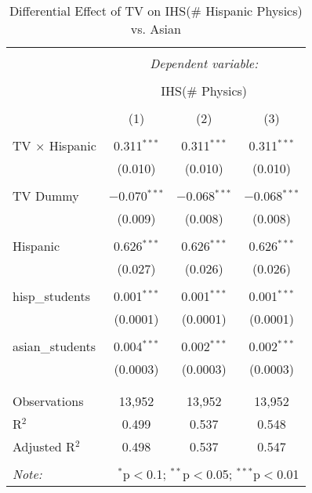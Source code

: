 
\begin{table}[!htbp] \centering 
  \caption{Differential Effect of TV on IHS(\# Hispanic Physics) vs. Asian} 
  \label{} 
\begin{tabular}{@{\extracolsep{-2pt}}lccc} 
\\[-1.8ex]\hline 
\hline \\[-1.8ex] 
 & \multicolumn{3}{c}{\textit{Dependent variable:}} \\ 
\cline{2-4} 
\\[-1.8ex] & \multicolumn{3}{c}{IHS(\# Physics)} \\ 
\\[-1.8ex] & (1) & (2) & (3)\\ 
\hline \\[-1.8ex] 
 TV $\times$ Hispanic & 0.311$^{***}$ & 0.311$^{***}$ & 0.311$^{***}$ \\ 
  & (0.010) & (0.010) & (0.010) \\ 
  & & & \\ 
 TV Dummy & $-$0.070$^{***}$ & $-$0.068$^{***}$ & $-$0.068$^{***}$ \\ 
  & (0.009) & (0.008) & (0.008) \\ 
  & & & \\ 
 Hispanic & 0.626$^{***}$ & 0.626$^{***}$ & 0.626$^{***}$ \\ 
  & (0.027) & (0.026) & (0.026) \\ 
  & & & \\ 
 hisp\_students & 0.001$^{***}$ & 0.001$^{***}$ & 0.001$^{***}$ \\ 
  & (0.0001) & (0.0001) & (0.0001) \\ 
  & & & \\ 
 asian\_students & 0.004$^{***}$ & 0.002$^{***}$ & 0.002$^{***}$ \\ 
  & (0.0003) & (0.0003) & (0.0003) \\ 
  & & & \\ 
\hline \\[-1.8ex] 
Observations & 13,952 & 13,952 & 13,952 \\ 
R$^{2}$ & 0.499 & 0.537 & 0.548 \\ 
Adjusted R$^{2}$ & 0.498 & 0.537 & 0.547 \\ 
\hline 
\hline \\[-1.8ex] 
\textit{Note:}  & \multicolumn{3}{r}{$^{*}$p$<$0.1; $^{**}$p$<$0.05; $^{***}$p$<$0.01} \\ 
\end{tabular} 
\end{table} 
